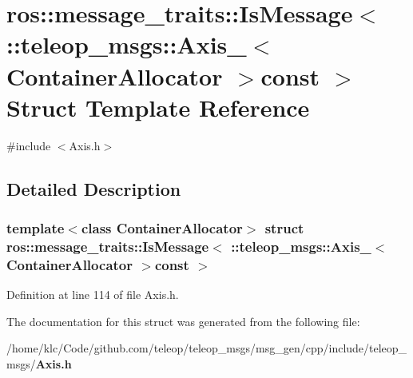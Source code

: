 \section{ros::message\_\-traits::IsMessage$<$ ::teleop\_\-msgs::Axis\_\-$<$ ContainerAllocator $>$const $>$ Struct Template Reference}
\label{structros_1_1message__traits_1_1IsMessage_3_01_1_1teleop__msgs_1_1Axis___3_01ContainerAllocator_01_4const_01_01_4}


{\ttfamily \#include $<$Axis.h$>$}



\subsection{Detailed Description}
\subsubsection*{template$<$class ContainerAllocator$>$ struct ros::message\_\-traits::IsMessage$<$ ::teleop\_\-msgs::Axis\_\-$<$ ContainerAllocator $>$const  $>$}



Definition at line 114 of file Axis.h.



The documentation for this struct was generated from the following file:\begin{DoxyCompactItemize}
\item 
/home/klc/Code/github.com/teleop/teleop\_\-msgs/msg\_\-gen/cpp/include/teleop\_\-msgs/{\bf Axis.h}\end{DoxyCompactItemize}
